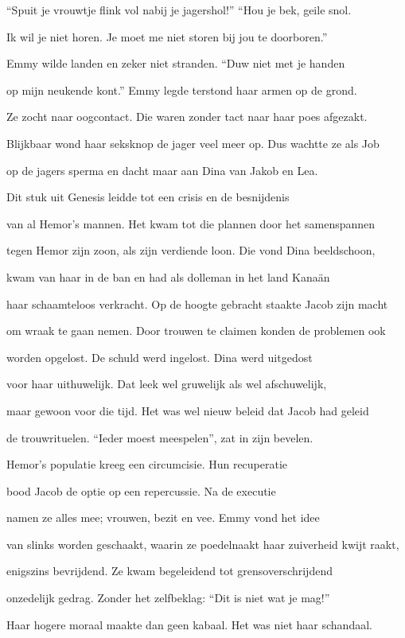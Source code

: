 “Spuit je vrouwtje flink vol
nabij je jagershol!”
“Hou je bek, geile snol.

Ik wil je niet horen.
Je moet me niet storen
bij jou te doorboren.”

Emmy wilde landen
en zeker niet stranden.
“Duw niet met je handen

op mijn neukende kont.”
Emmy legde terstond
haar armen op de grond.

Ze zocht naar oogcontact.
Die waren zonder tact
naar haar poes afgezakt.

Blijkbaar wond haar seksknop
de jager veel meer op.
Dus wachtte ze als Job

op de jagers sperma
en dacht maar aan Dina
van Jakob en Lea.

Dit stuk uit Genesis
leidde tot een crisis
en de besnijdenis

van al Hemor’s mannen.
Het kwam tot die plannen
door het samenspannen

tegen Hemor zijn zoon,
als zijn verdiende loon.
Die vond Dina beeldschoon,

kwam van haar in de ban
en had als dolleman
in het land Kanaän

haar schaamteloos verkracht.
Op de hoogte gebracht
staakte Jacob zijn macht

om wraak te gaan nemen.
Door trouwen te claimen
konden de problemen ook

worden opgelost.
De schuld werd ingelost.
Dina werd uitgedost

voor haar uithuwelijk.
Dat leek wel gruwelijk
als wel afschuwelijk,

maar gewoon voor die tijd.
Het was wel nieuw beleid
dat Jacob had geleid

de trouwrituelen.
“Ieder moest meespelen”,
zat in zijn bevelen.

Hemor’s populatie
kreeg een circumcisie.
Hun recuperatie

bood Jacob de optie
op een repercussie.
Na de executie

namen ze alles mee;
vrouwen, bezit en vee.
Emmy vond het idee

van slinks worden geschaakt,
waarin ze poedelnaakt
haar zuiverheid kwijt raakt,

enigszins bevrijdend.
Ze kwam begeleidend
tot grensoverschrijdend

onzedelijk gedrag.
Zonder het zelfbeklag:
“Dit is niet wat je mag!”

Haar hogere moraal
maakte dan geen kabaal.
Het was niet haar schandaal.

